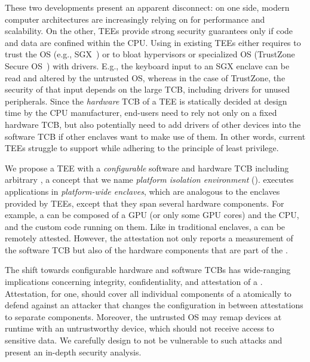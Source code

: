 These two developments present an apparent disconnect: on one side, modern computer architectures are increasingly relying on \sphw for performance and scalability. On the other, TEEs provide strong security guarantees only if code and data are confined within the CPU.
Using \sphw in existing TEEs either requires to trust the OS (e.g., SGX~\cite{costan2016intel}) or to bloat hypervisors or specialized OS (TrustZone Secure OS~\cite{TZOS}) with drivers. E.g., the keyboard input to an SGX enclave can be read and altered by the untrusted OS, whereas in the case of TrustZone, the security of that input depends on the large TCB, including drivers for unused peripherals. Since the \emph{hardware} TCB of a TEE is statically decided at design time by the CPU manufacturer, end-users need to rely not only on a fixed hardware TCB, but also potentially need to add drivers of other devices into the software TCB if other enclaves want to make use of them. In other words, current TEEs struggle to support \sphw while adhering to the principle of least privilege.

We propose a TEE with a \emph{configurable} software and hardware TCB including arbitrary \sphw, a concept that we name \emph{platform isolation environment} (\name). \name executes applications in \emph{platform-wide enclaves}, which are analogous to the enclaves provided by TEEs, except that they span several hardware components. For example, a \nameenclave{} can be composed of a GPU (or only some GPU cores) and the CPU, and the custom code running on them. Like in traditional enclaves, a \nameenclave{} can be remotely attested. However, the \name attestation not only reports a measurement of the software TCB but also of the hardware components that are part of the \nameenclave{}.

The shift towards configurable hardware and software TCBs has wide-ranging implications concerning integrity, confidentiality, and attestation of a \nameenclave{}. 
Attestation, for one, should cover all individual components of a \nameenclave{} atomically to defend against an attacker that changes the configuration in between attestations to separate components. 
Moreover, the untrusted OS may remap \sphw devices at runtime with an untrustworthy device, which should not receive access to sensitive data. We carefully design \name{} to not be vulnerable to such attacks and present an in-depth security analysis.

